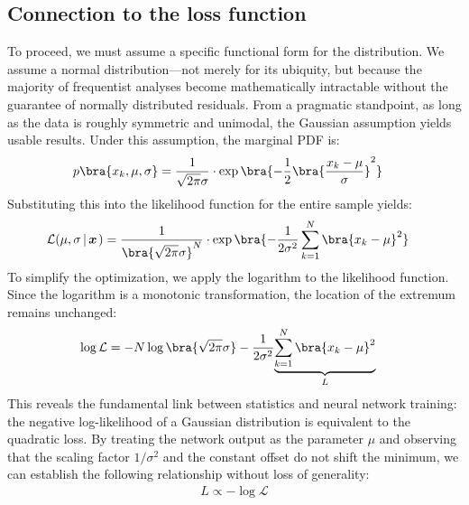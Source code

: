\subsection{Connection to the loss function}
To proceed, we must assume a specific functional form for the distribution. We assume a normal distribution—not merely for its ubiquity, but because the majority of frequentist analyses become mathematically intractable without the guarantee of normally distributed residuals. From a pragmatic standpoint, as long as the data is roughly symmetric and unimodal, the Gaussian assumption yields usable results. Under this assumption, the marginal PDF is:
\begin{align}
	\label{eq:norma}
	p\bra{x_k, \mu, \sigma}&=\frac{1}{\sqrt{2\pi}\sigma}\cdot\exp\bra{-\frac{1}{2}\bra{\frac{x_k-\mu}{\sigma}}^2}
\end{align}
Substituting this into the likelihood function for the entire sample yields:
\begin{align}
	\mathcal{L}(\mu,\sigma \left|\, \boldsymbol{x}\right.)&=\frac{1}{\bra{\sqrt{2\pi}\sigma}^N}\cdot\exp\bra{-\frac{1}{2\sigma^2}\sum\limits_{k=1}^N\bra{x_k-\mu}^2}
\end{align}
To simplify the optimization, we apply the logarithm to the likelihood function. Since the logarithm is a monotonic transformation, the location of the extremum remains unchanged:
\begin{align}
	\label{eq:loglikelihood}
	\log\mathcal{L}&=-N \log\bra{\sqrt{2\pi}\sigma}-\frac{1}{2\sigma^2}\underset{L}{\underbrace{\sum\limits_{k=1}^N\bra{x_k-\mu}^2}}
\end{align}
This reveals the fundamental link between statistics and neural network training: the negative log-likelihood of a Gaussian distribution is equivalent to the quadratic loss. By treating the network output as the parameter $\mu$ and observing that the scaling factor $1/\sigma^2$ and the constant offset do not shift the minimum, we can establish the following relationship without loss of generality:
\begin{align}
	\label{eq:losslikelihood}
	L \propto -\log\mathcal{L}
\end{align}

